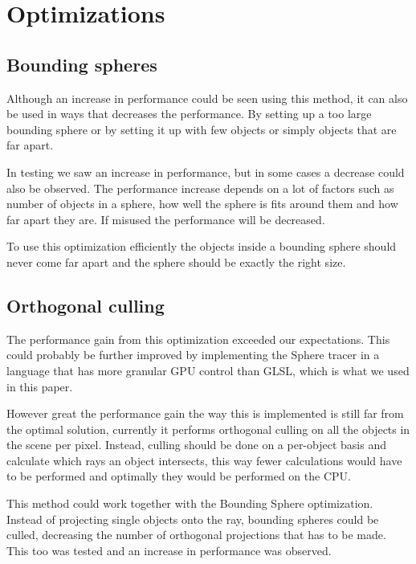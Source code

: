 	\section{Optimizations} \label{optimization}

		\subsection{Bounding spheres}

			Although an increase in performance could be seen using this
			method, it can also be used in ways that decreases the performance.
			By setting up a too large bounding sphere or by setting it up with
			few objects or simply objects that are far apart.

			In testing we saw an increase in performance, but in some cases a
			decrease could also be observed. The performance increase depends
			on a lot of factors such as number of objects in a sphere, how well
			the sphere is fits around them and how far apart they are. If
			misused the performance will be decreased.

			To use this optimization efficiently the objects inside a bounding
			sphere should never come far apart and the sphere should be exactly
			the right size.

		\subsection{Orthogonal culling}

			The performance gain from this optimization exceeded our 
			expectations. This could probably be further improved by 
			implementing the Sphere tracer in a language that has more granular 
			GPU control than GLSL, which is what we used in this paper.

			However great the performance gain the way this is implemented 
			is still far from the optimal solution, currently it performs 
			orthogonal culling on all the objects in the scene per pixel. 
			Instead, culling should be done on a per-object basis and calculate 
			which rays an object intersects, this way fewer calculations would
			have to be performed and optimally they would be performed on the
			CPU.

			This method could work together with the Bounding Sphere
			optimization. Instead of projecting single objects onto the ray,
			bounding spheres could be culled, decreasing the number of
			orthogonal projections that has to be made. This too was tested and
			an increase in performance was observed.


